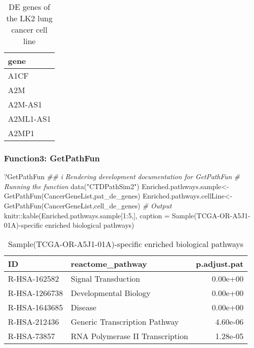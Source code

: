 \documentclass[]{article}
\newcommand{\hlnum}[1]{\textcolor[rgb]{0.816,0.125,0.439}{#1}}%
\newcommand{\hlstr}[1]{\textcolor[rgb]{0.251,0.627,0.251}{#1}}%
\newcommand{\hlcom}[1]{\textcolor[rgb]{0.502,0.502,0.502}{\textit{#1}}}%
\newcommand{\hlstd}[1]{\textcolor[rgb]{0.251,0.251,0.251}{#1}}%
\newenvironment{Shaded}{\begin{myshaded}}{\end{myshaded}}
\newcommand{\DecValTok}[1]{\hlnum{#1}}
\newcommand{\SpecialCharTok}[1]{\hlstr{#1}}
\newcommand{\StringTok}[1]{\hlstr{#1}}
\newcommand{\CommentTok}[1]{\hlcom{#1}}
\newcommand{\DocumentationTok}[1]{\hlcom{#1}}
\newcommand{\OtherTok}[1]{{#1}}
\newcommand{\FunctionTok}[1]{\hlstd{#1}}
\newcommand{\AttributeTok}[1]{{#1}}
\newcommand{\NormalTok}[1]{\hlstd{#1}}
\begin{document}
\begin{table}

\caption{\label{tab:unnamed-chunk-79}DE genes of the LK2 lung cancer cell line}
\centering
\begin{tabular}[t]{l}
\hline
gene\\
\hline
A1CF\\
\hline
A2M\\
\hline
A2M-AS1\\
\hline
A2ML1-AS1\\
\hline
A2MP1\\
\hline
\end{tabular}
\end{table}

\hypertarget{function3-getpathfun}{%
\subsubsection{\texorpdfstring{ Function3: GetPathFun}{  Function3: GetPathFun}}\label{function3-getpathfun}}

\begin{Shaded}
\begin{Highlighting}[]
\NormalTok{?GetPathFun}
\DocumentationTok{\#\# i Rendering development documentation for \textquotesingle{}GetPathFun\textquotesingle{}}
\CommentTok{\# Running the function}
\FunctionTok{data}\NormalTok{(}\StringTok{"CTDPathSim2"}\NormalTok{)}
\NormalTok{Enriched.pathways.sample}\OtherTok{\textless{}{-}}\FunctionTok{GetPathFun}\NormalTok{(CancerGeneList,pat\_de\_genes)}
\NormalTok{Enriched.pathways.cellLine}\OtherTok{\textless{}{-}}\FunctionTok{GetPathFun}\NormalTok{(CancerGeneList,cell\_de\_genes)}
\CommentTok{\# Output}
\NormalTok{knitr}\SpecialCharTok{::}\FunctionTok{kable}\NormalTok{(Enriched.pathways.sample[}\DecValTok{1}\SpecialCharTok{:}\DecValTok{5}\NormalTok{,], }\AttributeTok{caption =} \StringTok{\textquotesingle{}Sample(TCGA{-}OR{-}A5J1{-}01A){-}specific enriched biological pathways\textquotesingle{}}\NormalTok{)}
\end{Highlighting}
\end{Shaded}

\begin{table}

\caption{\label{tab:unnamed-chunk-80}Sample(TCGA-OR-A5J1-01A)-specific enriched biological pathways}
\centering
\begin{tabular}[t]{l|l|r}
\hline
ID & reactome\_pathway & p.adjust.pat\\
\hline
R-HSA-162582 & Signal Transduction & 0.00e+00\\
\hline
R-HSA-1266738 & Developmental Biology & 0.00e+00\\
\hline
R-HSA-1643685 & Disease & 0.00e+00\\
\hline
R-HSA-212436 & Generic Transcription Pathway & 4.60e-06\\
\hline
R-HSA-73857 & RNA Polymerase II Transcription & 1.28e-05\\
\hline
\end{tabular}
\end{table}
\end{document}
